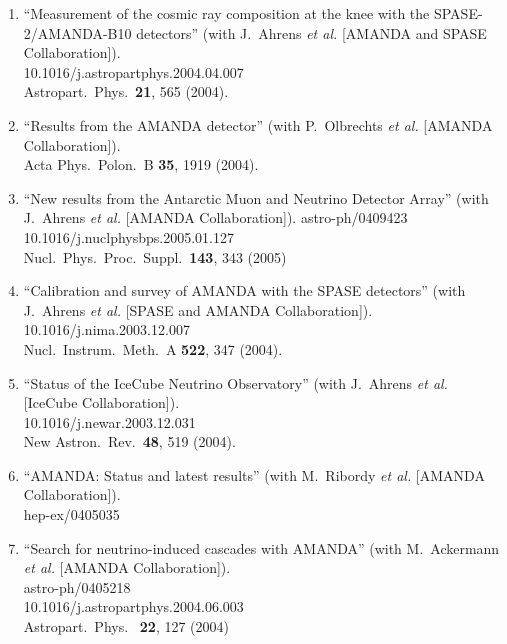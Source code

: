 \begin{enumerate}
\item ``Measurement of the cosmic ray composition at the knee with the
  SPASE-2/AMANDA-B10 detectors'' (with J.~Ahrens {\it et al.}  [AMANDA
    and SPASE Collaboration]).  \\{}10.1016/j.astropartphys.2004.04.007
  \\{}Astropart.\ Phys.\ {\bf 21}, 565 (2004). %


\item ``Results from the AMANDA detector'' (with P.~Olbrechts {\it et al.}
  [AMANDA Collaboration]).  \\{}Acta Phys.\ Polon.\ B {\bf 35}, 1919
  (2004). %


\item ``New results from the Antarctic Muon and Neutrino Detector Array'' (with J.~Ahrens {\it et al.}  [AMANDA Collaboration]). astro-ph/0409423 \\{}10.1016/j.nuclphysbps.2005.01.127
  \\{}Nucl.\ Phys.\ Proc.\ Suppl.\ {\bf 143}, 343 (2005) %


\item ``Calibration and survey of AMANDA with the SPASE detectors'' (with J.~Ahrens {\it et al.}  [SPASE and AMANDA Collaboration]). 10.1016/j.nima.2003.12.007 \\{}Nucl.\ Instrum.\ Meth.\ A {\bf
    522}, 347 (2004). %


\item ``Status of the IceCube Neutrino Observatory'' (with J.~Ahrens {\it et
  al.}  [IceCube Collaboration]).  \\{}10.1016/j.newar.2003.12.031
  \\{}New Astron.\ Rev.\ {\bf 48}, 519 (2004). %


\item ``AMANDA: Status and latest results'' (with M.~Ribordy {\it et al.}
  [AMANDA Collaboration]).  \\{}hep-ex/0405035
  


\item ``Search for neutrino-induced cascades with AMANDA'' (with M.~Ackermann
  {\it et al.}  [AMANDA Collaboration]).  \\{}astro-ph/0405218
  \\{}10.1016/j.astropartphys.2004.06.003 \\{}Astropart.\ Phys.\ {\bf
    22}, 127 (2004) %



\end{enumerate}
